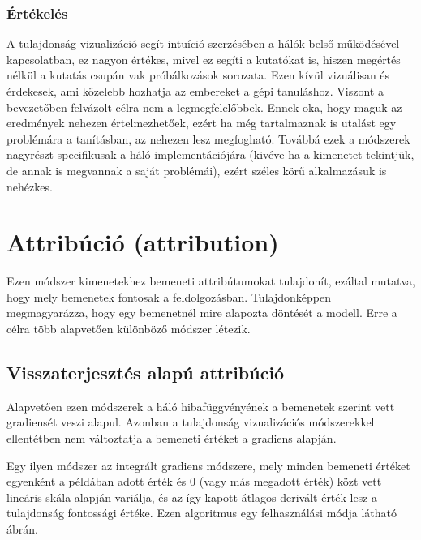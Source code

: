 \subsubsection{Értékelés}

A tulajdonság vizualizáció segít intuíció szerzésében a hálók belső működésével kapcsolatban, ez nagyon értékes, mivel ez segíti a kutatókat is, hiszen megértés nélkül a kutatás csupán vak próbálkozások sorozata. Ezen kívül vizuálisan és érdekesek, ami közelebb hozhatja az embereket a gépi tanuláshoz. Viszont a bevezetőben felvázolt célra nem a legmegfelelőbbek. Ennek oka, hogy maguk az eredmények nehezen értelmezhetőek, ezért ha még tartalmaznak is utalást egy problémára a tanításban, az nehezen lesz megfogható. Továbbá ezek a módszerek nagyrészt specifikusak a háló implementációjára (kivéve ha a kimenetet tekintjük, de annak is megvannak a saját problémái), ezért széles körű alkalmazásuk is nehézkes.

\section{Attribúció (attribution)}

Ezen módszer kimenetekhez bemeneti attribútumokat tulajdonít, ezáltal mutatva, hogy mely bemenetek fontosak a feldolgozásban. Tulajdonképpen megmagyarázza, hogy egy bemenetnél mire alapozta döntését a modell. Erre a célra több alapvetően különböző módszer létezik.

\subsection{Visszaterjesztés alapú attribúció}

Alapvetően ezen módszerek a háló hibafüggvényének a bemenetek szerint vett gradiensét veszi alapul. Azonban a tulajdonság vizualizációs módszerekkel ellentétben nem változtatja a bemeneti értéket a gradiens alapján. 

Egy ilyen módszer az integrált gradiens módszere, mely minden bemeneti értéket egyenként a példában adott érték és 0 (vagy más megadott érték) közt vett lineáris skála alapján variálja, és az így kapott átlagos derivált érték lesz a tulajdonság fontossági értéke. Ezen algoritmus egy felhasználási módja látható  ábrán.


